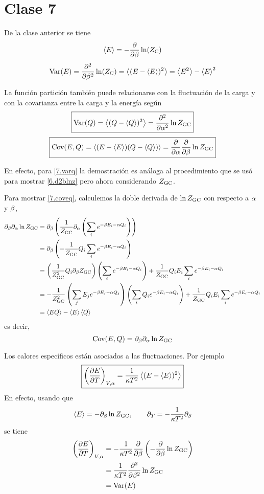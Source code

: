 \section{Clase 7}
De la clase anterior se tiene
\begin{equation}
\ev{E}=-\pdv{\b}\ln (\zc)
\end{equation}
\begin{equation}
\text{Var}(E)=\pdv[2]{\b}\ln(\zc)=\ev{(E-\ev{E})^2}=\ev{E^2}-\ev{E}^2
\end{equation}

La función partición también puede relacionarse con la fluctuación de la carga y con la covarianza entre la carga y la energía según
\begin{equation}\label{7.varq}
  \boxed{\var(Q)=\ev{(Q-\ev{Q})^2}=\pdv[2]{\a }\ln\zgc}
\end{equation}
\begin{equation}\label{7.coveq}
  \boxed{\text{Cov}(E,Q)=\ev{(E-\ev{E})(Q-\ev{Q})}=\pdv{\a }\pdv{\b }\ln\zgc}
\end{equation}

En efecto, para \eqref{7.varq} la demostración es análoga al procedimiento que se usó para mostrar \eqref{6.d2blnz} pero ahora considerando $Z_{\rm GC}$.

Para mostrar \eqref{7.coveq}, calculemos la doble derivada de $\ln Z_{\rm GC}$ con respecto a $\alpha$ y $\beta$,
\begin{align*}
 	\partial_\b\partial_\a \ln\zgc&=\partial_\b \left(\frac{1}{\zgc}\partial_\a \left(\sumi \eba\right)\right)\\
 	&=\partial_\b\left(-\frac{1}{\zgc}Q_i\sumi \eba\right)\\
 	&=\left(\frac{1}{\zgc^2}Q_i\partial_\b \zgc\right)\left(\sumi \eba\right)+\frac{1}{\zgc}Q_iE_i\sumi \eba\\
 	&=-\frac{1}{\zgc^2}\left(\sumj E_j\ebaj\right)\left(\sumi Q_i\eba\right)+\frac{1}{\zgc}Q_iE_i\sumi \eba\\
 	&=\ev{EQ}-\ev{E}\ev{Q}
\end{align*}
es decir,
\begin{equation}
  \text{Cov}(E,Q)=\partial_\beta\partial_\alpha \ln Z_{\rm GC}
\end{equation}

Los calores específicos están asociados a las fluctuaciones. Por ejemplo
\begin{equation}
  \boxed{\left(\pdv{E}{T}\right)_{V,\a }=\frac{1}{\k T^2}\ev{(E-\ev{E})^2}}
\end{equation}
En efecto, usando que
\begin{equation}
  \ev{E}=-\partial_\b \ln\zgc,\qquad \partial_T=-\frac{1}{\k T^2}\partial_\b 
\end{equation}
se tiene
\begin{align}
  \left(\pdv{E}{T}\right)_{V,\alpha }&=-\frac{1}{\kappa T^2}\pdv{\beta}\left(-\pdv{\beta}\ln Z_{\rm GC}\right)\\
  &=\frac{1}{\kappa T^2}\pdv[2]{\beta}\ln Z_{\rm GC}\\
  &=\text{Var} (E)
\end{align}

